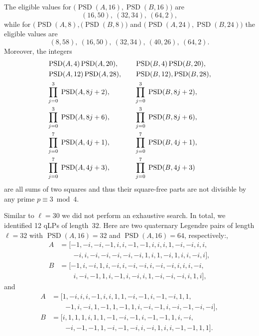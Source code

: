 \documentclass{article}
\theoremstyle{definition}
\newcommand{\PSD}{\operatorname{PSD}}
\begin{document}
The eligible values for
$\bigl(\PSD(A,16),\PSD(B,16)\bigr)$ are %
$$(16,50),\ (32,34),\ (64,2),$$
while for
$\bigl(\PSD(A,8),(\PSD(B,8)\bigr)$ and $\bigl(\PSD(A,24),\PSD(B,24)\bigr)$ the eligible values are 
$$(8,58),\ (16,50),\ (32,34),\ (40,26),\ (64,2).$$
Moreover, the integers
\begin{alignat*}{2}
  &  \PSD(A,4)\PSD(A,20),
  && \PSD(B,4)\PSD(B,20), \\
  &  \PSD(A,12)\PSD(A,28), \quad
  && \PSD(B,12),\PSD(B,28), \\
  &  \alprod{j=0}^3\ \PSD(A,8j+2),
  && \alprod{j=0}^3\ \PSD(B,8j+2), \\
  &  \alprod{j=0}^3\ \PSD(A,8j+6),
  && \alprod{j=0}^3\ \PSD(B,8j+6), \\
  &  \alprod{j=0}^7\ \PSD(A,4j+1),
  && \alprod{j=0}^7\ \PSD(B,4j+1), \\
  &  \alprod{j=0}^7\ \PSD(A,4j+3),
  && \alprod{j=0}^7\ \PSD(B,4j+3)
\end{alignat*}
are all sums of two squares and thus their square-free parts are not divisible by any prime $p\equiv 3\bmod 4$.

Similar to $\ell=30$ we did not perform an exhaustive search. In total, we identified 12 qLPs of length~$32$. Here are two quaternary Legendre pairs of length $\ell=32$ with $\PSD(A,16)=32$ and $\PSD(A,16)=64$, respectively:,
\begin{align*}
A &= [-1, -i, -i, -1, i, i, -1, -1, i, i, i, 1, -i, -i, i, i,\\
&\qquad {-i}, i, -i, -i, -i, -i, -i, 1, i, 1, -i, 1, i, i, -i, i],\\
B &= [-1, i, -i, 1, i, -i, i, -i, -i, i, -i, -i, i, i, i, -i,\\
&\qquad i, -i, -1, 1, i, -1, i, -i, i, 1, -i, -i, -i, i, 1, i],
\end{align*}
and
\begin{align*}
A &= [1, -i, i, i, -1, i, i, 1, 1, -i, -1, i, -1, -i, 1, 1,\\
&\qquad {-1}, i, -i, 1, -1, 1, -1, 1, i, -i, -1, i, -i, -1, -i, -i],\\
B &= [i, 1, 1, 1, i, 1, 1, -1, -i, -1, i, -1, -1, 1, i, -i,\\
&\qquad {-i}, -1, -1, 1, -i, -1, -i, i, -i, 1, i, i, -1, -1, 1, 1].
\end{align*}
\end{document}
